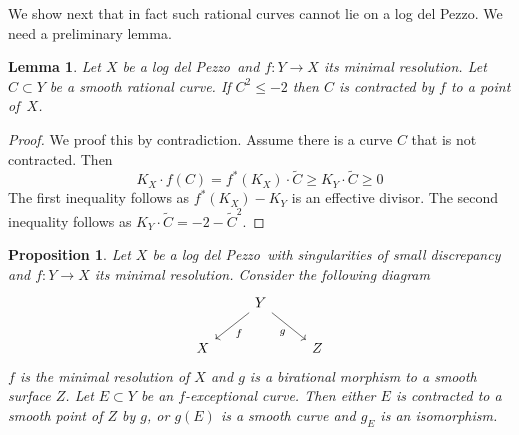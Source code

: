 \documentclass[12pt,a4paper]{book}      %
\newtheorem{prop}[thm]{Proposition}
\newtheorem{lem}[thm]{Lemma}
\newcommand{\ldp}{log del Pezzo}
\newcommand{\minres}{minimal resolution}
\newcommand{\ra}{\rightarrow}
\newcommand{\wt}[1]{\widetilde #1}
\begin{document}
We show next that in fact such rational curves cannot lie on a \ldp.
We need a preliminary lemma.
\begin{lem}\label{lem!minus2curve}
Let $X$ be a \ldp\ and $f \colon Y \rightarrow X$ its \minres.
Let $C\subset Y$ be a smooth rational curve. If $C^2\le-2$ then $C$ is contracted by $f$
to a point of~$X$.
\end{lem}

\begin{proof}
We proof this by contradiction. Assume there is a curve $C$ that is not contracted. Then 
\[
K_X \cdot f(C) = f^*(K_X) \cdot \wt{C} \geq K_Y \cdot \wt{C} \geq 0
\]
The first inequality follows as $f^*(K_X) - K_Y$ is an effective divisor. The second inequality follows as $K_Y \cdot \wt{C} = -2 - \wt{C}^2$.
\end{proof}

\begin{prop}\label{MainProp}
Let $X$ be a \ldp\ with singularities of small discrepancy and $f \colon Y \ra X$ its minimal resolution.
Consider the following diagram
\[
\begin{tikzcd}
  & Y \arrow[rd, "\scriptstyle{g}"'] \arrow[ld, "\scriptstyle{f}"] &   \\
X &                                                                & Z
\end{tikzcd}
\]
$f$ is the minimal resolution of $X$ and $g$ is a birational morphism to a smooth surface $Z$.
Let $E\subset Y$ be an $f$-exceptional curve. Then either $E$ is contracted to a smooth point
of $Z$ by $g$, or $g(E)$ is a smooth curve and $g_E$ is an isomorphism.
\end{prop}
\end{document}
